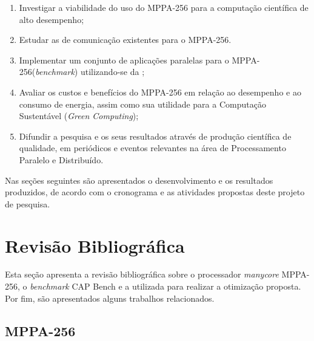 \documentclass[a4paper,11pt]{article}
\newcommand{\mppa}{MPPA-256\xspace}
\newcommand{\capb}{CAP Bench\xspace}
\newcommand{\manycore}{\textit{manycore}\xspace}
\newcommand{\bench}{\textit{benchmark}\xspace}
\begin{document}
\begin{enumerate}
	\setlength\itemsep{0em}
	\item Investigar a viabilidade do uso do \mppa para a computação científica de alto desempenho;
	\item Estudar as \apis de comunicação existentes para o \mppa.
	\item Implementar um conjunto de aplicações paralelas para o \mppa (\bench) utilizando-se da \api \async;
	\item Avaliar os custos e benefícios do \mppa em relação ao desempenho e ao consumo de energia, assim como sua utilidade para a Computação Sustentável (\textit{Green Computing});
	\item Difundir a pesquisa e os seus resultados através de produção científica de qualidade, em periódicos e eventos relevantes na área de Processamento Paralelo e Distribuído.
\end{enumerate}

Nas seções seguintes são apresentados o desenvolvimento e os resultados produzidos, de acordo com o cronograma e as atividades propostas deste projeto de pesquisa.

\section{Revisão Bibliográfica}

Esta seção apresenta a revisão bibliográfica sobre o processador \manycore \mppa, o \textit{benchmark} \capb e a \api utilizada para realizar a otimização proposta. Por fim, são apresentados alguns trabalhos relacionados.

\subsection{MPPA-256}
\label{subsec:mppa}
\end{document}
